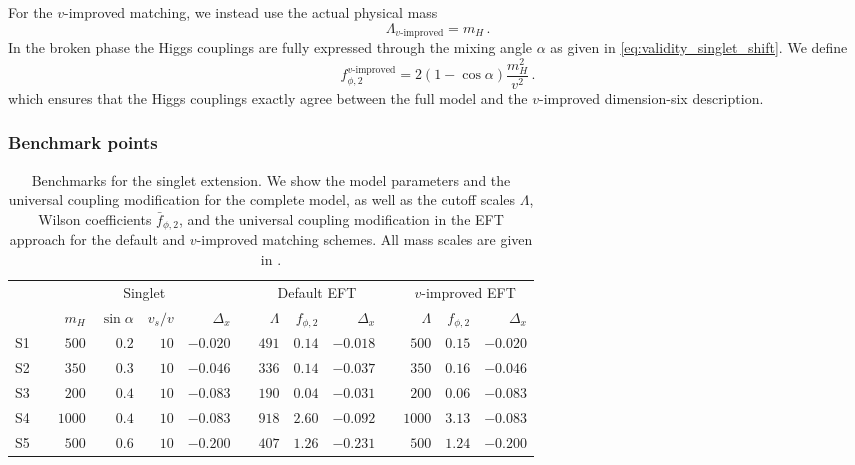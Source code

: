 For the $v$-improved matching, we instead use the actual physical mass
%
\begin{equation}
    \Lambda_{\text{$v$-improved}} = m_H \,.
\end{equation}
%
In the broken phase the Higgs couplings are fully expressed through
the mixing angle $\alpha$ as given in
\autoref{eq:validity_singlet_shift}. We define
%
\begin{equation}
  f_{\phi,2}^{\text{$v$-improved}} = 2 ( 1 - \cos \alpha) \frac {m_H^2} {v^2} \,.
\end{equation} 
%
which ensures that the Higgs couplings exactly agree between the full
model and the $v$-improved dimension-six description.



\subsubsection{Benchmark points}

\begin{table}
  \begin{tabular}{c c rrrr c rrr c rrr}
    \toprule
    \multirow{2}{*}{} && \multicolumn{4}{c}{Singlet} &&
    \multicolumn{3}{c}{Default EFT} && \multicolumn{3}{c}{$v$-improved EFT} \\
    \cmidrule{3-6} \cmidrule{8-10} \cmidrule{12-14}
    && $m_H$ & $\sin\alpha$ & $v_s/v$ & $\Delta_x$ &&
    $\Lambda$ & ${f}_{\phi,2}$ & $\Delta_x$ &&
    $\Lambda$ & ${f}_{\phi,2}$ & $\Delta_x$ \\
    \midrule
    S1 && $500$ & $0.2$ & $10$ & $-0.020$ && $491$ & $0.14$ & $-0.018$ && $500$ & $0.15$ & $-0.020$ \\
    S2 && $350$ & $0.3$ & $10$ & $-0.046$ && $336$ & $0.14$ &  $-0.037$ && $350$ & $0.16$ & $-0.046$ \\
    S3 && $200$ & $0.4$ & $10$ & $-0.083$ && $190$ & $0.04$ & $-0.031$ && $200$ & $0.06$ & $-0.083$ \\
    S4 && $1000$ & $0.4$ & $10$ & $-0.083$ && $918$ & $2.60$ & $-0.092$ && $1000$ & $3.13$ & $-0.083$ \\
    S5 && $500$ &  $0.6$ & $10$ & $-0.200$ && $407$ &$1.26$ & $-0.231$ && $500$ &  $1.24$ & $-0.200$ \\
    \bottomrule
    \end{tabular}
    \caption[Benchmarks for the singlet extension]{Benchmarks for the singlet extension.
      We show the model parameters and the universal coupling modification for the complete
      model, as well as the cutoff scales $\Lambda$, Wilson coefficients $\bar{f}_{\phi,2}$, and the
      universal coupling modification in the EFT approach for the default and $v$-improved
      matching schemes. All mass scales are given in \gev.}
  \label{tab:validity_singlet_benchmarks}
\end{table}

